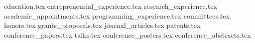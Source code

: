 \documentclass[11pt, a4paper]{awesome-cv}
\newcommand*{\sectiondir}{resume/}
\begin{document}
\makecvheader

{education.tex}
{entrepreneurial_experience.tex}
{research_experience.tex}
{academic_appointments.tex}
{programming_experience.tex}
{committees.tex}
{honors.tex}
\newpage
{grants_proposals.tex}
{journal_articles.tex}
\newpage
{patents.tex}
{conference_papers.tex}
{talks.tex}
{conference_posters.tex}
{conference_abstracts.tex}
\end{document}
